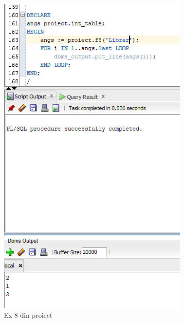 \documentclass[12pt]{article}
\begin{document}
\begin{figure}[!htb]
\includegraphics[max width=\linewidth]{imgs/ex13_3.png}
\caption{Ex 8 din proiect}
\label{fig:ex13_3}
\end{figure}
\end{document}
